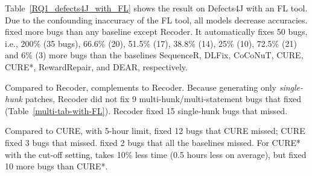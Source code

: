 Table~\ref{RQ1_defects4J_with_FL} shows the result on Defects4J with
an FL tool. Due to the confounding inaccuracy of the FL tool, all
models decrease accuracies. {\tool} fixed more bugs than any baseline
except Recoder. It automatically fixes 50 bugs, i.e., 200\% (35 bugs),
66.6\% (20), 51.5\% (17), 38.8\% (14), 25\% (10), 72.5\% (21) and
6\% (3) more bugs than the baselines SequenceR, DLFix, CoCoNuT, CURE,
CURE*, RewardRepair, and DEAR, respectively.

Compared to Recoder, {\tool} complements to Recoder.  Because
generating only {\em single-hunk} patches, Recoder did not fix 9
multi-hunk/multi-statement bugs that {\tool} fixed
(Table~\ref{multi-tab-with-FL}). Recoder fixed 15 single-hunk bugs that {\tool} missed.

Compared to CURE, with 5-hour limit, {\tool} fixed 12 bugs that CURE
missed; CURE fixed 3 bugs that {\tool} missed. {\tool} fixed
2 bugs that all the baselines missed. For CURE* with the
cut-off setting, {\tool} takes 10\% less time (0.5 hours less on
average), but fixed 10 more bugs than CURE*.




%





